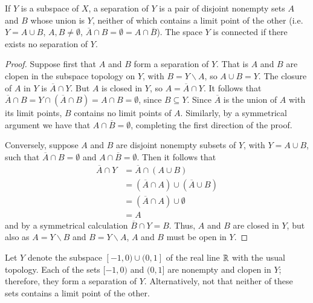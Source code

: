 \documentclass[12pt, a4paper, oneside, openright, titlepage]{book}
\begin{document}
\begin{lemma}
    If $Y$ is a subspace of $X$, a separation of $Y$ is a pair of disjoint nonempty sets $A$ and $B$ whose union is $Y$, neither of which contains a limit point of the other (i.e. $Y = A \cup B$, $A,B\neq \emptyset$, $\overline{A}\cap B = \emptyset = A\cap \overline{B}$). The space $Y$ is connected if there exists no separation of $Y$.
\end{lemma}
\begin{proof}
    Suppose first that $A$ and $B$ form a separation of $Y$. That is $A$ and $B$ are clopen in the subspace topology on $Y$, with $B = Y\backslash A$, so $A \cup B = Y$. The closure of $A$ in $Y$ is $\overline{A} \cap Y$. But $A$ is closed in $Y$, so $A = \overline{A}\cap Y$. It follows that $\overline{A}\cap B = Y\cap (\overline{A}\cap B) = A\cap B = \emptyset$, since $B \subseteq Y$. Since $\overline{A}$ is the union of $A$ with its limit points, $B$ contains no limit points of $A$. Similarly, by a symmetrical argument we have that $A\cap \overline{B} = \emptyset$, completing the first direction of the proof.

    Conversely, suppose $A$ and $B$ are disjoint nonempty subsets of $Y$, with $Y = A\cup B$, such that $\overline{A} \cap B = \emptyset$ and $A\cap \overline{B} = \emptyset$. Then it follows that \begin{align*}
        \overline{A}\cap Y &= \overline{A}\cap (A\cup B) \\
        &= (\overline{A}\cap A)\cup(\overline{A}\cup B) \\
        &= (\overline{A}\cap A)\cup \emptyset \\
        &= A
    \end{align*}
    and by a symmetrical calculation $\overline{B}\cap Y = B$. Thus, $A$ and $B$ are closed in $Y$, but also as $A = Y\backslash B$ and $B = Y\backslash A$, $A$ and $B$ must be open in $Y$.
\end{proof}

\begin{example}
    Let $Y$ denote the subspace $[-1,0)\cup(0,1]$ of the real line $\mathbb R$ with the usual topology. Each of the sets $[-1,0)$ and $(0,1]$ are nonempty and clopen in $Y$; therefore, they form a separation of $Y$. Alternatively, not that neither of these sets contains a limit point of the other.
\end{example}
\end{document}
